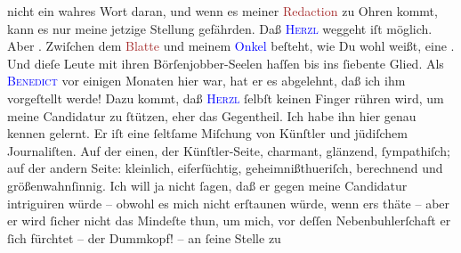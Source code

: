                nicht ein wahres Wort daran, und wenn es meiner \textcolor{brown}{Redaction}{} zu Ohren kommt, kann es nur meine jetzige Stellung
               gefährden. Daß \textsc{\textcolor{blue}{Herzl}{}\ledrightnote{\textcolor{blue}{Theodor Herzl}}} weggeht {\pb}iſt möglich. Aber \label{K_L02619-2v}\label{K_L02619-2h}. Zwiſchen dem \textcolor{brown}{Blatte}{} und meinem \textcolor{blue}{Onkel}{} beſteht, wie Du wohl weißt, eine
                  \label{K_L02619-5v}\label{K_L02619-5h}. Und dieſe Leute mit ihren
               Börſenjobber-Seelen haſſen bis ins ſiebente Glied. Als \textsc{\textcolor{blue}{Benedict}{}\ledrightnote{\textcolor{blue}{Moriz Benedikt}}} vor einigen Monaten hier war, hat er es abgelehnt, daß ich ihm vorgeſtellt
               werde! Dazu kommt, daß \textsc{\textcolor{blue}{Herzl}{}\ledrightnote{\textcolor{blue}{Theodor Herzl}}} ſelbſt keinen Finger rühren wird, um meine Candidatur zu ſtützen, eher das
               Gegentheil. Ich habe ihn hier genau kennen gelernt. Er iſt {\pb}eine ſeltſame Miſchung von Künſtler und jüdiſchem
               Journaliſten. Auf der einen, der Künſtler-Seite, charmant, glänzend, ſympathiſch; auf
               der andern Seite: kleinlich, eiferſüchtig,  geheimnißthueriſch, berechnend und größenwahnſinnig. Ich will ja nicht ſagen,
               daß er gegen meine Candidatur intriguiren würde – obwohl es mich nicht erſtaunen
               würde, wenn ers thäte – aber er wird ſicher nicht das Mindeſte thun, um mich, vor
               deſſen Nebenbuhlerſchaft er ſich fürchtet – der Dummkopf! – an ſeine Stelle zu
